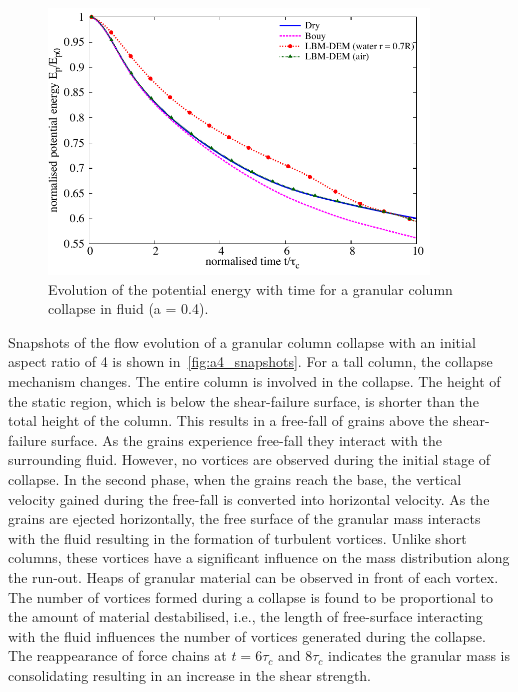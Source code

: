 \begin{figure}
	\centering
    \includegraphics[width=0.9\textwidth]{PE_a04f}
    \caption{Evolution of the potential energy with time for a granular column 
    collapse in fluid (a = 0.4).}
    \label{fig:PE_a04f}
\end{figure}


Snapshots of the flow evolution of a granular column collapse with an initial 
aspect ratio of 4 is shown in~\cref{fig:a4_snapshots}. For a tall column, the 
collapse mechanism changes. The entire column is involved in the collapse. The 
height of the static region, which is below the shear-failure surface, is 
shorter than the total height of the column. This results in a free-fall of 
grains above the shear-failure surface. As the grains experience free-fall they 
interact with the surrounding fluid. However, no vortices are observed during 
the initial stage of collapse. In the second phase, when the grains reach the 
base, the vertical velocity gained during the free-fall is converted into
horizontal velocity. As the grains are ejected horizontally, the free 
surface of the granular mass interacts with the fluid resulting in the 
formation of turbulent vortices. Unlike short columns, these vortices have 
a significant influence on the mass distribution along the run-out. Heaps of 
granular material can be observed in front of each vortex. The number of 
vortices formed during a collapse is found to be proportional to the amount of 
material destabilised, i.e., the length of free-surface interacting with the 
fluid influences the number of vortices generated during the collapse. The 
reappearance of force chains at $t = 6\tau_c$ and $8\tau_c$ indicates the 
granular mass is consolidating resulting in an increase in the shear strength. 

